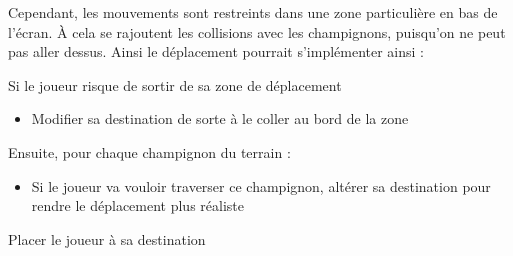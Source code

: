 
Cependant, les mouvements sont restreints dans une zone particulière en bas de l'écran. À cela se rajoutent les collisions avec les champignons, puisqu'on ne peut pas aller dessus. Ainsi le déplacement pourrait s'implémenter ainsi :

\begin{algoinfo}
	\item Si le joueur risque de sortir de sa zone de déplacement
	\begin{itemize}
		\item Modifier sa destination de sorte à le coller au bord de la zone
	\end{itemize}
	\item Ensuite, pour chaque champignon du terrain :
	\begin{itemize}
		\item Si le joueur va vouloir traverser ce champignon, altérer sa destination pour rendre le déplacement plus réaliste
	\end{itemize}
	\item Placer le joueur à sa destination
\end{algoinfo}


